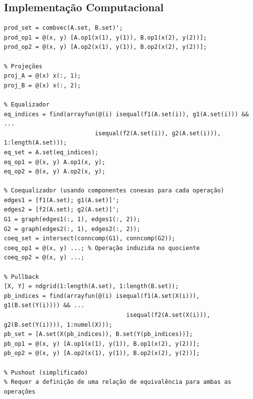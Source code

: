 \subsection{Implementação Computacional}
\begin{lstlisting}[caption={Construções Universais em DIMag}]
% Produto e Projeções
prod_set = combvec(A.set, B.set)';
prod_op1 = @(x, y) [A.op1(x(1), y(1)), B.op1(x(2), y(2))];
prod_op2 = @(x, y) [A.op2(x(1), y(1)), B.op2(x(2), y(2))];

% Projeções
proj_A = @(x) x(:, 1);
proj_B = @(x) x(:, 2);

% Equalizador
eq_indices = find(arrayfun(@(i) isequal(f1(A.set(i)), g1(A.set(i))) && ...
                          isequal(f2(A.set(i)), g2(A.set(i))), 1:length(A.set)));
eq_set = A.set(eq_indices);
eq_op1 = @(x, y) A.op1(x, y);
eq_op2 = @(x, y) A.op2(x, y);

% Coequalizador (usando componentes conexas para cada operação)
edges1 = [f1(A.set); g1(A.set)]';
edges2 = [f2(A.set); g2(A.set)]';
G1 = graph(edges1(:, 1), edges1(:, 2));
G2 = graph(edges2(:, 1), edges2(:, 2));
coeq_set = intersect(conncomp(G1), conncomp(G2));
coeq_op1 = @(x, y) ...; % Operação induzida no quociente
coeq_op2 = @(x, y) ...;

% Pullback
[X, Y] = ndgrid(1:length(A.set), 1:length(B.set));
pb_indices = find(arrayfun(@(i) isequal(f1(A.set(X(i))), g1(B.set(Y(i)))) && ...
                                   isequal(f2(A.set(X(i))), g2(B.set(Y(i)))), 1:numel(X)));
pb_set = [A.set(X(pb_indices)), B.set(Y(pb_indices))];
pb_op1 = @(x, y) [A.op1(x(1), y(1)), B.op1(x(2), y(2))];
pb_op2 = @(x, y) [A.op2(x(1), y(1)), B.op2(x(2), y(2))];

% Pushout (simplificado)
% Requer a definição de uma relação de equivalência para ambas as operações
\end{lstlisting}